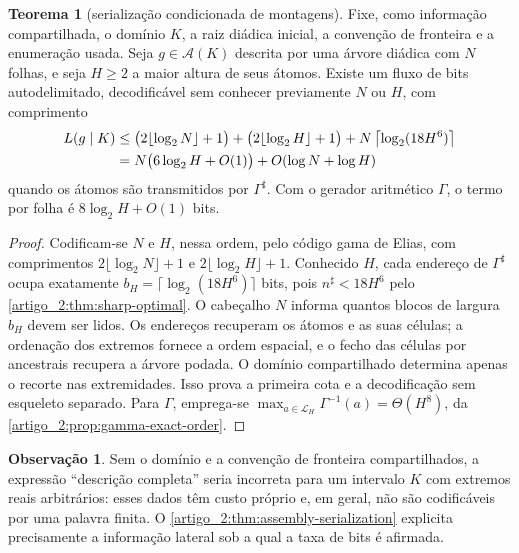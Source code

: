 \documentclass[12pt,a4paper]{article}
\theoremstyle{preciso}
\theoremstyle{definition}
\newcommand{\Aclass}{\mathcal{A}}
\newcommand{\Library}{\mathcal{L}}
\theoremstyle{preciso}
\newtheorem{theorem}[teorema]{Teorema}
\theoremstyle{preciso}
\theoremstyle{preciso}
\theoremstyle{preciso}
\theoremstyle{definition}
\theoremstyle{preciso}
\theoremstyle{definition}
\newtheorem{remark}[teorema]{Observação}
\theoremstyle{preciso}
\theoremstyle{preciso}
\theoremstyle{definition}
\begin{document}
\begin{theorem}[serialização condicionada de montagens]\label{map:artigo_2:3.9}\label{artigo_2:thm:assembly-serialization}
Fixe, como informação compartilhada, o domínio $K$, a raiz diádica inicial,
a convenção de fronteira e a enumeração usada. Seja $g\in\Aclass(K)$ descrita
por uma árvore diádica com $N$ folhas, e seja $H\ge2$ a maior altura de seus
átomos. Existe um fluxo de bits autodelimitado, decodificável sem conhecer
previamente $N$ ou $H$, com comprimento
\begin{align}
 L(g\mid K)
 &\le \bigl(2\lfloor\log_2N\rfloor+1\bigr)
      +\bigl(2\lfloor\log_2H\rfloor+1\bigr)
      +N\left\lceil\log_2(18H^6)\right\rceil \notag\\
 &=N\bigl(6\log_2H+O(1)\bigr)+O(\log N+\log H)
 \label{artigo_2:eq:assembly-bitrate}
\end{align}
quando os átomos são transmitidos por $\Gamma^\sharp$. Com o gerador
aritmético $\Gamma$, o termo por folha é $8\log_2H+O(1)$ bits.
\end{theorem}

\begin{proof}
Codificam-se $N$ e $H$, nessa ordem, pelo código gama de Elias, com comprimentos
$2\lfloor\log_2N\rfloor+1$ e
$2\lfloor\log_2H\rfloor+1$. Conhecido $H$, cada endereço de $\Gamma^\sharp$
ocupa exatamente
$b_H=\lceil\log_2(18H^6)\rceil$ bits, pois
$n^\sharp<18H^6$ pelo \cref{artigo_2:thm:sharp-optimal}. O cabeçalho $N$ informa
quantos blocos de largura $b_H$ devem ser lidos. Os endereços recuperam os
átomos e as suas células; a ordenação dos extremos fornece a ordem espacial, e o fecho
das células por ancestrais recupera a árvore podada. O domínio compartilhado
determina apenas o recorte nas extremidades. Isso prova a primeira cota e a
decodificação sem esqueleto separado. Para $\Gamma$, emprega-se
$\max_{a\in\Library_H}\Gamma^{-1}(a)=\Theta(H^8)$, da
\cref{artigo_2:prop:gamma-exact-order}.
\end{proof}

\begin{remark}\label{map:artigo_2:3.10}
Sem o domínio e a convenção de fronteira compartilhados, a expressão
``descrição completa'' seria incorreta para um intervalo $K$ com extremos
reais arbitrários: esses dados têm custo próprio e, em
geral, não são codificáveis por uma palavra finita. O \cref{artigo_2:thm:assembly-serialization} explicita
precisamente a informação lateral sob a qual a taxa de bits é afirmada.
\end{remark}
\end{document}
